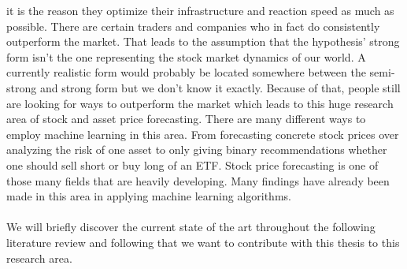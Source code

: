 \documentclass[a4paper,12pt]{report}
\begin{document}
it is the reason they optimize their infrastructure and reaction speed as much as possible. There are certain traders and companies who in fact do consistently outperform the market. That leads to the assumption that the hypothesis’ strong form isn’t the one representing the stock market dynamics of our world. A currently realistic form would probably be located somewhere between the semi-strong and strong form but we don’t know it exactly. Because of that, people still are looking for ways to outperform the market which leads to this huge research area of stock and asset price forecasting. There are many different ways to employ machine learning in this area. From forecasting concrete stock prices over analyzing the risk of one asset to only giving binary recommendations whether one should sell short or buy long of an ETF. Stock price forecasting is one of those many fields that are heavily developing. Many findings have already been made in this area in applying machine learning algorithms. \\
\\
We will briefly discover the current state of the art throughout the following literature review and following that we want to contribute with this thesis to this research area.
\end{document}

